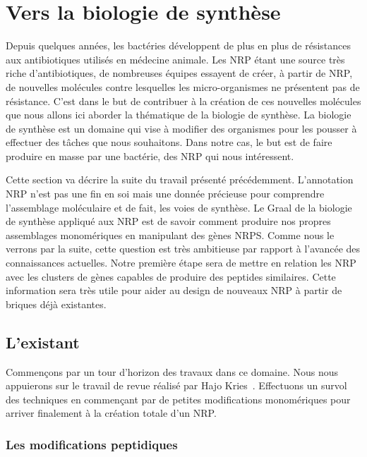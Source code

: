 \newpage
\section{Vers la biologie de synthèse}
\label{bio_synth}

Depuis quelques années, les bactéries développent de plus en plus de résistances aux antibiotiques utilisés en médecine animale.
Les NRP étant une source très riche d'antibiotiques, de nombreuses équipes essayent de créer, à partir de NRP, de nouvelles molécules contre lesquelles les micro-organismes ne présentent pas de résistance.
C'est dans le but de contribuer à la création de ces nouvelles molécules que nous allons ici aborder la thématique de la biologie de synthèse.
La biologie de synthèse est un domaine qui vise à modifier des organismes pour les pousser à effectuer des tâches que nous souhaitons.
Dans notre cas, le but est de faire produire en masse par une bactérie, des NRP qui nous intéressent.

Cette section va décrire la suite du travail présenté précédemment.
L'annotation NRP n'est pas une fin en soi mais une donnée précieuse pour comprendre l'assemblage moléculaire et de fait, les voies de synthèse.
Le Graal de la biologie de synthèse appliqué aux NRP est de savoir comment produire nos propres assemblages monomériques en manipulant des gènes NRPS.
Comme nous le verrons par la suite, cette question est très ambitieuse par rapport à l'avancée des connaissances actuelles.
Notre première étape sera de mettre en relation les NRP avec les clusters de gènes capables de produire des peptides similaires.
Cette information sera très utile pour aider au design de nouveaux NRP à partir de briques déjà existantes.


\subsection{L'existant}

Commençons par un tour d'horizon des travaux dans ce domaine.
Nous nous appuierons sur le travail de revue réalisé par Hajo Kries~\cite{kries_biosynthetic_2016}.
Effectuons un survol des techniques en commençant par de petites modifications monomériques pour arriver finalement à la création totale d'un NRP.


\subsubsection{Les modifications peptidiques}

